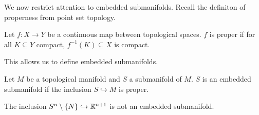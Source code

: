 We now restrict attention to embedded submanifolds. Recall the definiton of properness from point set topology. 
\begin{definition}[Proper]\label{def: proper map}
    Let $f:X\to Y$ be a continuous map between topological spaces. $f$ is proper if for all $K\subseteq Y$ compact, $f^{-1}(K)\subseteq X$ is compact. 
\end{definition}
This allows us to define embedded submanifolds. 
\begin{definition}\label{def: embedded submanifold}
    Let $M$ be a topological manifold and $S$ a submanifold of $M$. $S$ is an embedded submanifold if the inclusion $S\hookrightarrow M$ is proper. 
\end{definition}
\begin{example}
    The inclusion $S^{n}\setminus\{N\}\hookrightarrow\mathbb{R}^{n+1}$ is not an embedded submanifold. 
\end{example}